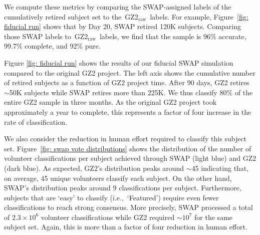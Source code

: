 \documentclass[twocolumn]{aastex6}
\newcommand{\feat}{`Featured'}
\newcommand{\raw}{GZ2$_{\text{raw}}$}
\begin{document}
We compute these metrics by comparing the SWAP-assigned labels of
the cumulatively retired subject set  to the~\raw~labels. 
For example, Figure~\ref{fig: fiducial run} shows that by Day 20, 
SWAP retired 120K subjects. Comparing those SWAP labels to~\raw~labels, 
we find that the sample is 96\% accurate, 99.7\% complete, and 92\% pure. 

Figure \ref{fig: fiducial run} shows the results of our fiducial SWAP simulation
compared to the original GZ2 project. The left axis shows the cumulative
number of retired subjects as a function of GZ2 project time. 
After 90 days, GZ2 retires $\sim$50K subjects while SWAP retires more than 225K. 
We thus classify 80\% of the entire GZ2 sample in three months. 
As the original GZ2 project took approximately a year to complete, this
represents a factor of four increase in the rate of classification. 

We also consider the reduction in human effort required to classify
this subject set. Figure~\ref{fig: swap vote distributions} shows the 
distribution of the number of volunteer classifications per subject 
achieved through SWAP (light blue) and GZ2 (dark blue). 
As expected, GZ2's distribution peaks around $\sim$45 indicating that, on average,
45 unique volunteers classify each subject. On the other hand, SWAP's
distribution peaks around 9 classifications per subject. 
Furthermore, subjects that are `easy' to classify (i.e.,~\feat) require
even fewer classifications to reach strong consensus. 
More precisely, SWAP processed a total of $2.3 \times 10^6$ volunteer 
classifications while GZ2 required $\sim$$10^7$ for the same subject set. 
Again, this is more than a factor of four reduction in human effort. 


\end{document}
